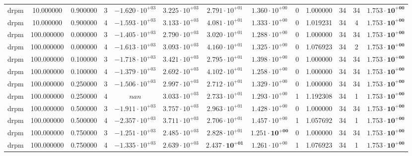 \begin{table}
\begin{tabular}{ccccccccccccc}
drpm & 10.000000 & 0.900000 & 3 & $-1.620 \cdot 10^{+03}$ & $3.225 \cdot 10^{+03}$ & $2.791 \cdot 10^{+01}$ & $1.360 \cdot 10^{+00}$ & 0 & 1.000000 & 34 & 34 & $\mathbf{1.753 \cdot 10^{+00}}$ \\
drpm & 10.000000 & 0.900000 & 4 & $-1.593 \cdot 10^{+03}$ & $3.133 \cdot 10^{+03}$ & $4.081 \cdot 10^{+01}$ & $1.333 \cdot 10^{+00}$ & 0 & 1.019231 & 34 & 4 & $\mathbf{1.753 \cdot 10^{+00}}$ \\
drpm & 100.000000 & 0.000000 & 3 & $-1.405 \cdot 10^{+03}$ & $2.790 \cdot 10^{+03}$ & $3.020 \cdot 10^{+01}$ & $1.288 \cdot 10^{+00}$ & 0 & 1.000000 & 34 & 34 & $\mathbf{1.753 \cdot 10^{+00}}$ \\
drpm & 100.000000 & 0.000000 & 4 & $-1.613 \cdot 10^{+03}$ & $3.093 \cdot 10^{+03}$ & $4.160 \cdot 10^{+01}$ & $1.325 \cdot 10^{+00}$ & 0 & 1.076923 & 34 & 2 & $\mathbf{1.753 \cdot 10^{+00}}$ \\
drpm & 100.000000 & 0.100000 & 3 & $-1.718 \cdot 10^{+03}$ & $3.421 \cdot 10^{+03}$ & $2.795 \cdot 10^{+01}$ & $1.398 \cdot 10^{+00}$ & 0 & 1.000000 & 34 & 34 & $\mathbf{1.753 \cdot 10^{+00}}$ \\
drpm & 100.000000 & 0.100000 & 4 & $-1.379 \cdot 10^{+03}$ & $2.692 \cdot 10^{+03}$ & $4.102 \cdot 10^{+01}$ & $1.258 \cdot 10^{+00}$ & 0 & 1.000000 & 34 & 34 & $\mathbf{1.753 \cdot 10^{+00}}$ \\
drpm & 100.000000 & 0.250000 & 3 & $-1.506 \cdot 10^{+03}$ & $2.997 \cdot 10^{+03}$ & $2.712 \cdot 10^{+01}$ & $1.329 \cdot 10^{+00}$ & 0 & 1.000000 & 34 & 34 & $\mathbf{1.753 \cdot 10^{+00}}$ \\
drpm & 100.000000 & 0.250000 & 4 & $nan$ & $3.033 \cdot 10^{+03}$ & $2.733 \cdot 10^{+01}$ & $1.293 \cdot 10^{+00}$ & 1 & 1.192308 & 34 & 1 & $\mathbf{1.753 \cdot 10^{+00}}$ \\
drpm & 100.000000 & 0.500000 & 3 & $-1.911 \cdot 10^{+03}$ & $3.757 \cdot 10^{+03}$ & $2.963 \cdot 10^{+01}$ & $1.428 \cdot 10^{+00}$ & 0 & 1.000000 & 34 & 34 & $\mathbf{1.753 \cdot 10^{+00}}$ \\
drpm & 100.000000 & 0.500000 & 4 & $-2.357 \cdot 10^{+03}$ & $3.711 \cdot 10^{+03}$ & $2.706 \cdot 10^{+01}$ & $1.457 \cdot 10^{+00}$ & 1 & 1.057692 & 34 & 1 & $\mathbf{1.753 \cdot 10^{+00}}$ \\
drpm & 100.000000 & 0.750000 & 3 & $-1.251 \cdot 10^{+03}$ & $2.485 \cdot 10^{+03}$ & $2.828 \cdot 10^{+01}$ & $\mathbf{1.251 \cdot 10^{+00}}$ & 0 & 1.000000 & 34 & 34 & $\mathbf{1.753 \cdot 10^{+00}}$ \\
drpm & 100.000000 & 0.750000 & 4 & $-1.335 \cdot 10^{+03}$ & $2.639 \cdot 10^{+03}$ & $\mathbf{2.437 \cdot 10^{+01}}$ & $1.261 \cdot 10^{+00}$ & 1 & 1.076923 & 34 & 1 & $\mathbf{1.753 \cdot 10^{+00}}$ \\

\end{tabular}
\end{table}
